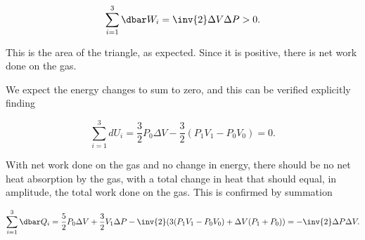 {\begin{equation}\label{eqn:basicStatMechProblemSet4Problem2:280}
\sum_{i = 1}^3 \dbar W_i = \inv{2} \Delta V \Delta P > 0.
\end{equation}

This is the area of the triangle, as expected.  Since it is positive, there is net work done on the gas.

We expect the energy changes to sum to zero, and this can be verified explicitly finding

\begin{equation}\label{eqn:basicStatMechProblemSet4Problem2:300}
\sum_{i = 1}^3 d U_i = 
\frac{3}{2} P_0 \Delta V 
-\frac{3}{2} ( P_1 V_1 - P_0 V_0 ) = 0.
\end{equation}

With net work done on the gas and no change in energy, there should be no net heat absorption by the gas, with a total change in heat that should equal, in amplitude, the total work done on the gas.  This is confirmed by summation

\begin{equation}\label{eqn:basicStatMechProblemSet4Problem2:320}
\sum_{i = 1}^3 \dbar Q_i = 
\frac{5}{2} P_0 \Delta V 
+\frac{3}{2} V_1 \Delta P 
-\inv{2} ( 3(P_1 V_1 - P_0 V_0) + \Delta V (P_1 + P_0)) 
=
-\inv{2} \Delta P \Delta V.
\end{equation}
}
